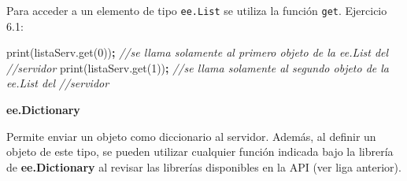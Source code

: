\documentclass[
]{article}
\newenvironment{Shaded}{\begin{snugshade}}{\end{snugshade}}
\newcommand{\AttributeTok}[1]{\textcolor[rgb]{0.77,0.63,0.00}{#1}}
\newcommand{\CommentTok}[1]{\textcolor[rgb]{0.56,0.35,0.01}{\textit{#1}}}
\newcommand{\DecValTok}[1]{\textcolor[rgb]{0.00,0.00,0.81}{#1}}
\newcommand{\FloatTok}[1]{\textcolor[rgb]{0.00,0.00,0.81}{#1}}
\newcommand{\KeywordTok}[1]{\textcolor[rgb]{0.13,0.29,0.53}{\textbf{#1}}}
\newcommand{\NormalTok}[1]{#1}
\newcommand{\OperatorTok}[1]{\textcolor[rgb]{0.81,0.36,0.00}{\textbf{#1}}}
\newcommand{\StringTok}[1]{\textcolor[rgb]{0.31,0.60,0.02}{#1}}
\newcommand{\VariableTok}[1]{\textcolor[rgb]{0.00,0.00,0.00}{#1}}
\begin{document}
\begin{Shaded}
\end{Shaded}

Para acceder a un elemento de tipo \texttt{ee.List} se utiliza la
función \texttt{get}. Ejercicio 6.1:

\begin{Shaded}
\begin{Highlighting}[]
\AttributeTok{print}\NormalTok{(}\VariableTok{listaServ}\NormalTok{.}\AttributeTok{get}\NormalTok{(}\DecValTok{0}\NormalTok{))}\OperatorTok{;}   \CommentTok{//se llama solamente al primero objeto de la ee.List del }
\CommentTok{//servidor}
\AttributeTok{print}\NormalTok{(}\VariableTok{listaServ}\NormalTok{.}\AttributeTok{get}\NormalTok{(}\DecValTok{1}\NormalTok{))}\OperatorTok{;}   \CommentTok{//se llama solamente al segundo objeto de la ee.List del }
\CommentTok{//servidor}
\end{Highlighting}
\end{Shaded}

\textbf{ee.Dictionary}

Permite enviar un objeto como diccionario al servidor. Además, al
definir un objeto de este tipo, se pueden utilizar cualquier función
indicada bajo la librería de \textbf{ee.Dictionary} al revisar las
librerías disponibles en la API (ver liga anterior).
\end{document}

